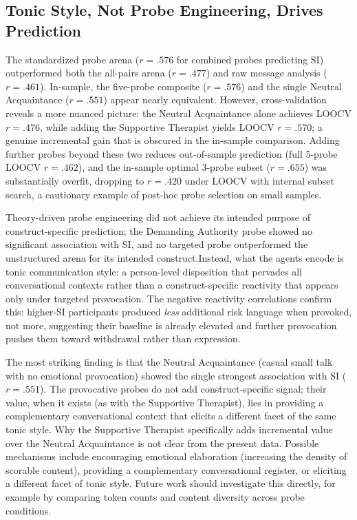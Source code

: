 \documentclass[review,12pt,authoryear]{elsarticle}
\begin{document}
\subsection{Tonic Style, Not Probe Engineering, Drives Prediction}

The standardized probe arena ($r = .576$ for combined probes predicting SI) outperformed both the all-pairs arena ($r = .477$) and raw message analysis ($r = .461$). In-sample, the five-probe composite ($r = .576$) and the single Neutral Acquaintance ($r = .551$) appear nearly equivalent. However, cross-validation reveals a more nuanced picture: the Neutral Acquaintance alone achieves LOOCV $r = .476$, while adding the Supportive Therapist yields LOOCV $r = .570$; a genuine incremental gain that is obscured in the in-sample comparison. Adding further probes beyond these two reduces out-of-sample prediction (full 5-probe LOOCV $r = .462$), and the in-sample optimal 3-probe subset ($r = .655$) was substantially overfit, dropping to $r = .420$ under LOOCV with internal subset search, a cautionary example of post-hoc probe selection on small samples.

Theory-driven probe engineering did not achieve its intended purpose of construct-specific prediction; the Demanding Authority probe showed no significant association with SI, and no targeted probe outperformed the unstructured arena for its intended construct.Instead, what the agents encode is tonic communication style: a person-level disposition that pervades all conversational contexts rather than a construct-specific reactivity that appears only under targeted provocation. The negative reactivity correlations confirm this: higher-SI participants produced \textit{less} additional risk language when provoked, not more, suggesting their baseline is already elevated and further provocation pushes them toward withdrawal rather than expression.

The most striking finding is that the Neutral Acquaintance (casual small talk with no emotional provocation) showed the single strongest association with SI ($r = .551$). The provocative probes do not add construct-specific signal; their value, when it exists (as with the Supportive Therapist), lies in providing a complementary conversational context that elicits a different facet of the same tonic style. Why the Supportive Therapist specifically adds incremental value over the Neutral Acquaintance is not clear from the present data. Possible mechanisms include encouraging emotional elaboration (increasing the density of scorable content), providing a complementary conversational register, or eliciting a different facet of tonic style. Future work should investigate this directly, for example by comparing token counts and content diversity across probe conditions.
\end{document}
